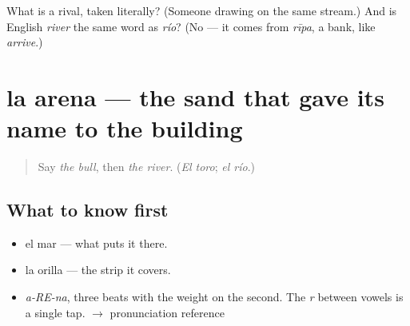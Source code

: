 \begin{tcolorbox}[breakable,colback=teal!4,colframe=teal!35!black,title={Before you move on}]
What is a rival, taken literally? (Someone drawing on the same stream.) And is English \emph{river} the same word as \emph{río}? (No — it comes from \emph{rīpa}, a bank, like \emph{arrive}.)
\end{tcolorbox}
\section[la arena]{la arena — the sand that gave its name to the building}

\label{lesson:ES-C369-arena}



\begin{quote}
Say \emph{the bull}, then \emph{the river}. (\emph{El toro}; \emph{el río}.)
\end{quote}

\subsection*{What to know first}
\begin{itemize}
\raggedright
  \item el mar — what puts it there.
  \item la orilla — the strip it covers.
\end{itemize}

\begin{sounds}
\begin{itemize}
\raggedright
  \item \emph{a-RE-na}, three beats with the weight on the second. The \emph{r} between vowels is a single tap. $\to$ pronunciation reference
\end{itemize}
\end{sounds}

